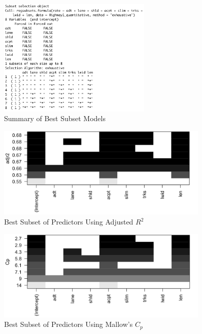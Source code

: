 \documentclass[12pt]{report}
\begin{document}
\begin{figure}[H]
    \centering
    \includegraphics[width=0.65\textwidth]{Variable Selection/ST562 Subset Summary.png}
    \caption{Summary of Best Subset Models} \label{fig:VS1}
\end{figure}
\noindent

\begin{figure}[H]
    \centering
    \includegraphics[width=0.9\textwidth]{Variable Selection/ST562 R^2.png}
    \caption{Best Subset of Predictors Using Adjusted $R^{2}$} \label{fig:VS2}
\end{figure}
\noindent

\begin{figure}[H]
    \centering
    \includegraphics[width=0.9\textwidth]{Variable Selection/ST562 Cp.png}
    \caption{Best Subset of Predictors Using Mallow's $C_{p}$} \label{fig:VS3}
\end{figure}
\noindent
\end{document}
